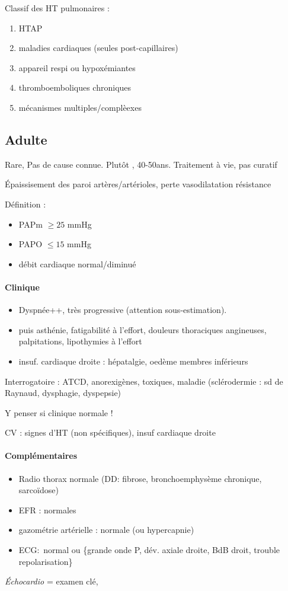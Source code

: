 \documentclass{article}
\begin{document}
Classif des HT pulmonaires : 
\begin{enumerate}
  \item HTAP
  \item maladies cardiaques (seules post-capillaires)
  \item appareil respi ou hypoxémiantes
  \item thromboemboliques chroniques
  \item mécanismes multiples/complèexes
\end{enumerate}
\subsection{Adulte}
Rare, Pas de cause connue. Plutôt \female{}, 40-50ans. Traitement à vie, pas curatif

Épaissisement des paroi artères/artérioles, perte vasodilatation \thus \inc résistance

Définition : 
\begin{itemize}
  \item \gls{PAPm} $\ge 25$ mmHg 
  \item \gls{PAPO} $\le 15$ mmHg
\item débit cardiaque normal/diminué
\end{itemize}

\paragraph{Clinique}
\begin{itemize}
  \item Dyspnée++, très progressive (attention sous-estimation). 
  \item puis asthénie, fatigabilité à l'effort, douleurs thoraciques angineuses,
    palpitations, lipothymies à l'effort
  \item insuf. cardiaque droite : hépatalgie, oedème membres inférieurs
\end{itemize}
Interrogatoire : ATCD, anorexigènes, toxiques, maladie (sclérodermie : sd de
Raynaud, dysphagie, dyspepsie)

Y penser si clinique normale !

CV : signes d'HT (non spécifiques), insuf cardiaque droite
\paragraph{Complémentaires}
\begin{itemize}
  \item Radio thorax normale (DD: fibrose, bronchoemphysème chronique,
    sarcoïdose)
  \item EFR : normales
  \item gazométrie artérielle : normale (ou hypercapnie)
  \item ECG: normal ou \{grande onde P, dév. axiale droite, BdB droit, trouble
    repolarisation\}
\end{itemize}
\textit{Échocardio}  = examen clé, 
\end{document}
